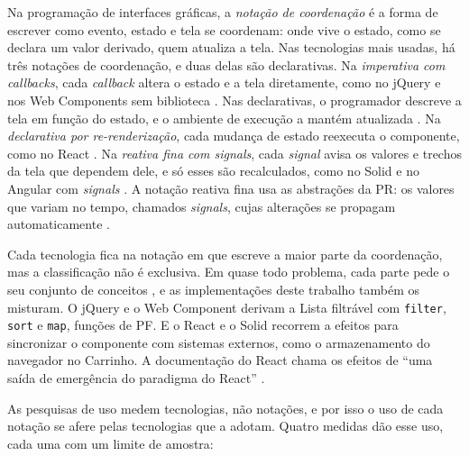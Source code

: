 Na programação de interfaces gráficas, a \emph{notação de coordenação} é a forma
de escrever como evento, estado e tela se coordenam: onde vive o estado,
como se declara um valor derivado, quem atualiza a tela.
Nas tecnologias mais usadas, há três notações de coordenação, e duas delas
são declarativas.
Na \emph{imperativa com callbacks}, cada \emph{callback} altera o estado e a tela
diretamente, como no jQuery \cite{openjs2026} e nos Web Components sem
biblioteca \cite{mozilla2026}.
Nas declarativas, o programador descreve a tela em função do estado, e o
ambiente de execução a mantém atualizada \cite{meta2026a}.
Na \emph{declarativa por re-renderização}, cada mudança de estado reexecuta o
componente, como no React \cite{meta2026}.
Na \emph{reativa fina com signals}, cada \emph{signal} avisa os valores e trechos da
tela que dependem dele, e só esses são recalculados, como no Solid e no
Angular com \emph{signals} \cite{solidjs2026,google2026}.
A notação reativa fina usa as abstrações da PR: os valores que variam no
tempo, chamados \emph{signals}, cujas alterações se propagam automaticamente
\cite{salvaneschi2015}.

Cada tecnologia fica na notação em que escreve a maior parte da
coordenação, mas a classificação não é exclusiva.
Em quase todo problema, cada parte pede o seu conjunto de conceitos
\cite[p. 10]{roy2009}, e as implementações deste trabalho também os
misturam.
O jQuery e o Web Component derivam a Lista filtrável com \texttt{filter}, \texttt{sort} e
\texttt{map}, funções de PF.
E o React e o Solid recorrem a efeitos para sincronizar o componente com
sistemas externos, como o armazenamento do navegador no Carrinho.
A documentação do React chama os efeitos de “uma saída de emergência do
paradigma do React” \cite[tradução nossa]{meta2026d}.

As pesquisas de uso medem tecnologias, não notações, e por isso o uso de
cada notação se afere pelas tecnologias que a adotam.
Quatro medidas dão esse uso, cada uma com um limite de amostra:

